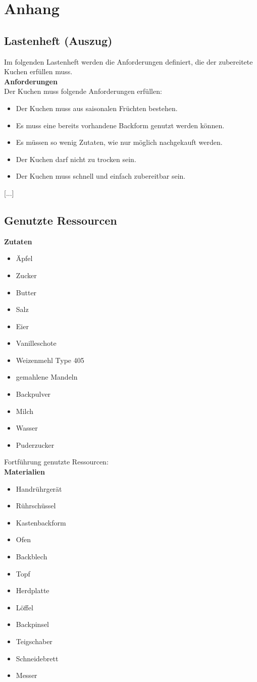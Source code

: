 \section{Anhang}
\subsection{Lastenheft (Auszug)}
Im folgenden Lastenheft werden die Anforderungen definiert, die der zubereitete Kuchen erfüllen muss.
\\[12pt]
\textbf{Anforderungen}
\\[12pt]
Der Kuchen muss folgende Anforderungen erfüllen:
\begin{itemize}
    \item Der Kuchen muss aus saisonalen Früchten bestehen.
    \item Es muss eine bereits vorhandene Backform genutzt werden können.
    \item Es müssen so wenig Zutaten, wie nur möglich nachgekauft werden.
    \item Der Kuchen darf nicht zu trocken sein.
    \item Der Kuchen muss schnell und einfach zubereitbar sein. 
\end{itemize}
\begin{center}
    [...]
\end{center}
\subsection{Genutzte Ressourcen}
\textbf{Zutaten}
\begin{itemize}
    \item Äpfel
    \item Zucker
    \item Butter
    \item Salz
    \item Eier
    \item Vanilleschote
    \item Weizenmehl Type 405
    \item gemahlene Mandeln
    \item Backpulver
    \item Milch
    \item Wasser
    \item Puderzucker
\end{itemize}
\newpage
Fortführung genutzte Ressourcen:
\\[12pt]
\textbf{Materialien}
\begin{itemize}
    \item Handrührgerät
    \item Rührschüssel
    \item Kastenbackform
    \item Ofen
    \item Backblech
    \item Topf
    \item Herdplatte
    \item Löffel
    \item Backpinsel
    \item Teigschaber
    \item Schneidebrett
    \item Messer
\end{itemize}
